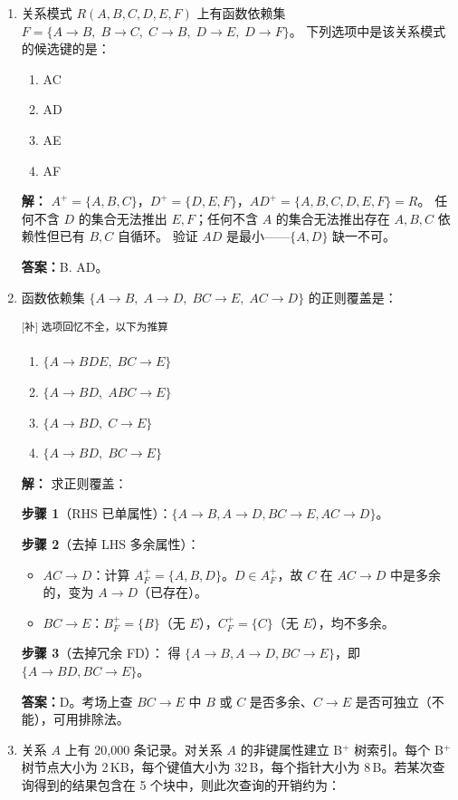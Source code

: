\documentclass[11pt,a4paper]{article}
\newcommand{\solution}{\par\noindent\textcolor{ansblue}{\textbf{解：}}}
\newcommand{\answer}{\par\noindent\textcolor{ansred}{\textbf{答案：}}}
\newcommand{\supp}[1]{\textcolor{ansred}{\textsuperscript{[补] #1}}}
\begin{document}
\begin{enumerate}[leftmargin=*,itemsep=8pt]
\item 关系模式 $R(A,B,C,D,E,F)$ 上有函数依赖集
$F = \{A \to B,\; B \to C,\; C \to B,\; D \to E,\; D \to F\}$。
下列选项中是该关系模式的候选键的是：

\begin{enumerate}[label=\Alph*.]
  \item AC
  \item AD
  \item AE
  \item AF
\end{enumerate}

\solution
$A^+ = \{A,B,C\}$，$D^+ = \{D,E,F\}$，$AD^+ = \{A,B,C,D,E,F\} = R$。
任何不含 $D$ 的集合无法推出 $E,F$；任何不含 $A$ 的集合无法推出存在 $A,B,C$ 依赖性但已有 $B,C$ 自循环。
验证 $AD$ 是最小——$\{A,D\}$ 缺一不可。

\answer B. AD。

\item 函数依赖集 $\{A \to B,\; A \to D,\; BC \to E,\; AC \to D\}$ 的正则覆盖是：

\supp{选项回忆不全，以下为推算}

\begin{enumerate}[label=\Alph*.]
  \item $\{A \to BDE,\; BC \to E\}$
  \item $\{A \to BD,\; ABC \to E\}$
  \item $\{A \to BD,\; C \to E\}$
  \item $\{A \to BD,\; BC \to E\}$
\end{enumerate}

\solution
求正则覆盖：

\textbf{步骤 1}（RHS 已单属性）：$\{A \to B, A \to D, BC \to E, AC \to D\}$。

\textbf{步骤 2}（去掉 LHS 多余属性）：
\begin{itemize}[nosep]
  \item $AC \to D$：计算 $A^+_F = \{A,B,D\}$。$D \in A^+_F$，故 $C$ 在 $AC \to D$ 中是多余的，变为 $A \to D$（已存在）。
  \item $BC \to E$：$B^+_F = \{B\}$（无 $E$），$C^+_F = \{C\}$（无 $E$），均不多余。
\end{itemize}

\textbf{步骤 3}（去掉冗余 FD）：
得 $\{A \to B, A \to D, BC \to E\}$，即 $\{A \to BD, BC \to E\}$。

\answer D。考场上查 $BC \to E$ 中 $B$ 或 $C$ 是否多余、$C \to E$ 是否可独立（不能），可用排除法。

\item 关系 $A$ 上有 20,000 条记录。对关系 $A$ 的非键属性建立 B$^+$ 树索引。每个 B$^+$ 树节点大小为 2\,KB，每个键值大小为 32\,B，每个指针大小为 8\,B。若某次查询得到的结果包含在 5 个块中，则此次查询的开销约为：


\end{enumerate}
\end{document}
